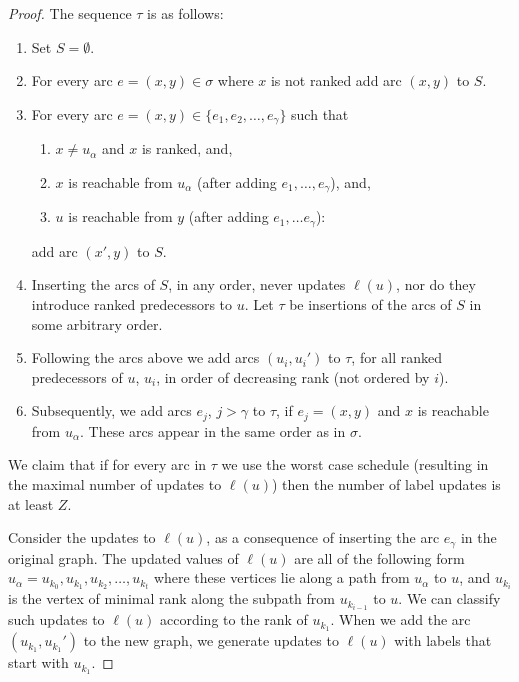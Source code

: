\documentclass[11pt]{article}
\theoremstyle{plain}
\theoremstyle{definition}
\theoremstyle{remark}
\numberwithin{equation}{section}
\begin{document}
\begin{proof}
   The sequence $\tau$ is as follows:
   \begin{enumerate}
   \item Set $S=\emptyset$.
   \item For every arc $e=(x,y)\in \sigma$ where $x$ is not ranked add arc $(x,y)$ to $S$.
   \item For every arc $e=(x,y)\in \{ e_1, e_2, \ldots, e_\gamma \}$ such that \begin{enumerate} \item  $x\neq u_\alpha$ and $x$ is ranked, and, \item  $x$ is reachable from $u_\alpha$ (after adding $e_1, \ldots, e_\gamma$), and, \item $u$ is reachable from $y$ (after adding $e_1, \ldots e_\gamma$):
   \end{enumerate}  add arc $(x',y)$ to $S$.
   \item Inserting the arcs of $S$, in any order, never updates $\ell(u)$, nor do they introduce ranked predecessors to $u$. Let $\tau$ be insertions of the arcs of $S$ in some arbitrary order.
   \item \label{tau:ui} Following the arcs above we add arcs $(u_i,u_i')$ to $\tau$, for all ranked predecessors of $u$, $u_i$, in order of decreasing rank (not ordered by $i$).
   \item Subsequently, we add arcs $e_j$, $j>\gamma$ to $\tau$, if $e_j=(x,y)$ and $x$ is reachable from $u_\alpha$. These arcs appear in the same order as in $\sigma$.
   \end{enumerate}

We claim that if for every arc in $\tau$ we use the worst case
schedule (resulting in the maximal number of updates to $\ell(u)$)
then the number of label updates is at least $Z$.

Consider the updates to $\ell(u)$, as a consequence of inserting the
arc $e_\gamma$ in the original graph. The updated values of
$\ell(u)$ are all of the following form $u_\alpha=u_{k_0}, u_{k_1},
u_{k_2}, \ldots, u_{k_t}$ where these vertices lie along a path from
$u_{\alpha}$ to $u$, and $u_{k_i}$ is the vertex of minimal rank
along the subpath from $u_{k_{i-1}}$ to $u$.
   We can classify such updates to $\ell(u)$ according to the rank of $u_{k_1}$. When we add the arc $(u_{k_1}, u_{k_1}')$ to the new graph, we generate updates to $\ell(u)$ with labels that start with $u_{k_1}$.


\end{proof}
\end{document}
